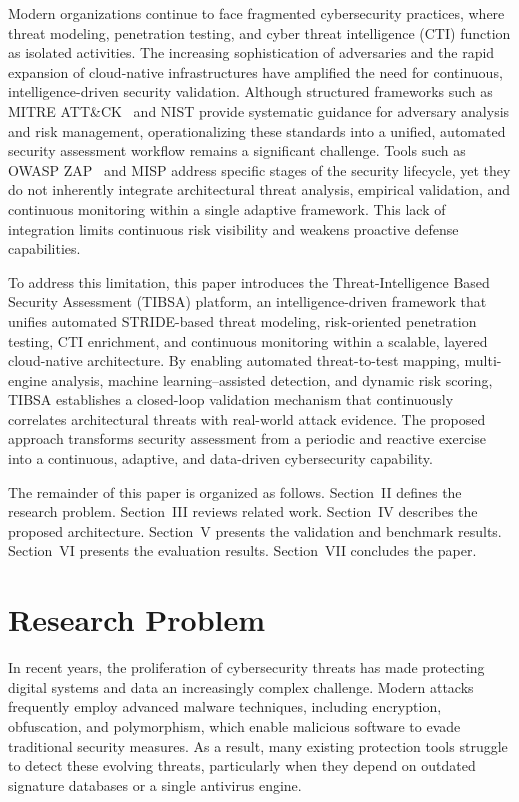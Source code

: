 \documentclass[12pt, a4paper]{article}
\begin{document}
Modern organizations continue to face fragmented cybersecurity practices, where threat modeling, penetration testing, and cyber threat intelligence (CTI) function as isolated activities. The increasing sophistication of adversaries and the rapid expansion of cloud-native infrastructures have amplified the need for continuous, intelligence-driven security validation. Although structured frameworks such as MITRE ATT\&CK~\cite{ref7} and NIST provide systematic guidance for adversary analysis and risk management, operationalizing these standards into a unified, automated security assessment workflow remains a significant challenge. Tools such as OWASP ZAP~\cite{ref5} and MISP address specific stages of the security lifecycle, yet they do not inherently integrate architectural threat analysis, empirical validation, and continuous monitoring within a single adaptive framework. This lack of integration limits continuous risk visibility and weakens proactive defense capabilities.

To address this limitation, this paper introduces the Threat-Intelligence Based Security Assessment (TIBSA) platform, an intelligence-driven framework that unifies automated STRIDE-based threat modeling, risk-oriented penetration testing, CTI enrichment, and continuous monitoring within a scalable, layered cloud-native architecture. By enabling automated threat-to-test mapping, multi-engine analysis, machine learning--assisted detection, and dynamic risk scoring, TIBSA establishes a closed-loop validation mechanism that continuously correlates architectural threats with real-world attack evidence. The proposed approach transforms security assessment from a periodic and reactive exercise into a continuous, adaptive, and data-driven cybersecurity capability.

The remainder of this paper is organized as follows. Section~II defines the research problem. Section~III reviews related work. Section~IV describes the proposed architecture. Section~V presents the validation and benchmark results. Section~VI presents the evaluation results. Section~VII concludes the paper.

\section{Research Problem}

In recent years, the proliferation of cybersecurity threats has made protecting digital systems and data an increasingly complex challenge. Modern attacks frequently employ advanced malware techniques, including encryption, obfuscation, and polymorphism, which enable malicious software to evade traditional security measures. As a result, many existing protection tools struggle to detect these evolving threats, particularly when they depend on outdated signature databases or a single antivirus engine.
\end{document}
